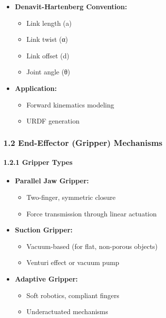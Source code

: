 \documentclass[
]{article}
\providecommand{\tightlist}{%
  \setlength{\itemsep}{0pt}\setlength{\parskip}{0pt}}
\begin{document}
\begin{itemize}
\tightlist
\item
  \textbf{Denavit-Hartenberg Convention:}

  \begin{itemize}
  \tightlist
  \item
    Link length (a)
  \item
    Link twist (α)
  \item
    Link offset (d)
  \item
    Joint angle (θ)
  \end{itemize}
\item
  \textbf{Application:}

  \begin{itemize}
  \tightlist
  \item
    Forward kinematics modeling
  \item
    URDF generation
  \end{itemize}
\end{itemize}

\hypertarget{end-effector-gripper-mechanisms}{%
\subsubsection{1.2 End-Effector (Gripper)
Mechanisms}\label{end-effector-gripper-mechanisms}}

\hypertarget{gripper-types}{%
\paragraph{1.2.1 Gripper Types}\label{gripper-types}}

\begin{itemize}
\tightlist
\item
  \textbf{Parallel Jaw Gripper:}

  \begin{itemize}
  \tightlist
  \item
    Two-finger, symmetric closure
  \item
    Force transmission through linear actuation
  \end{itemize}
\item
  \textbf{Suction Gripper:}

  \begin{itemize}
  \tightlist
  \item
    Vacuum-based (for flat, non-porous objects)
  \item
    Venturi effect or vacuum pump
  \end{itemize}
\item
  \textbf{Adaptive Gripper:}

  \begin{itemize}
  \tightlist
  \item
    Soft robotics, compliant fingers
  \item
    Underactuated mechanisms
  \end{itemize}
\end{itemize}
\end{document}
